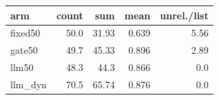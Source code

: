 \begin{tabular}{lrrrr}
\toprule
arm & count & sum & mean & unrel./list \\
\midrule
fixed50 & 50.0 & 31.93 & 0.639 & 5.56 \\
gate50 & 49.7 & 45.33 & 0.896 & 2.89 \\
llm50 & 48.3 & 44.3 & 0.866 & 0.0 \\
llm\_dyn & 70.5 & 65.74 & 0.876 & 0.0 \\
\bottomrule
\end{tabular}
